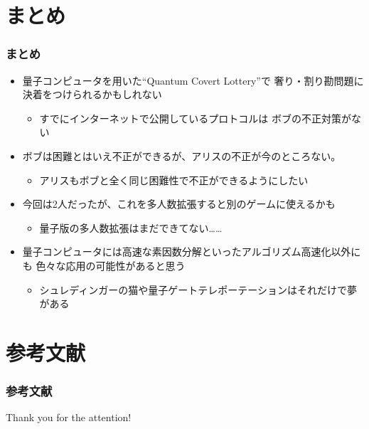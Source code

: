 \section{まとめ}

\begin{frame}
  \frametitle{まとめ}

  \pause
  \begin{itemize}
    \item<+-> 量子コンピュータを用いた``Quantum Covert Lottery''で
    奢り・割り勘問題に決着をつけられるかもしれない
    \begin{itemize} 
      \item すでにインターネットで公開しているプロトコル\cite{quantum_covert_lottery}は
      ボブの不正対策がない
    \end{itemize}

    \item<+-> ボブは困難とはいえ不正ができるが、アリスの不正が今のところない。
    \begin{itemize} 
      \item アリスもボブと全く同じ困難性で不正ができるようにしたい
    \end{itemize}

    \item<+-> 今回は2人だったが、これを多人数拡張すると別のゲームに使えるかも
    \begin{itemize}
      \item 量子版の多人数拡張はまだできてない……
    \end{itemize}

    \item<+-> 量子コンピュータには高速な素因数分解といったアルゴリズム高速化以外にも
    色々な応用の可能性があると思う
    \begin{itemize}
      \item シュレディンガーの猫や量子ゲートテレポーテーションはそれだけで夢がある
    \end{itemize}
  \end{itemize}
\end{frame}

\section*{参考文献}
\begin{frame}[allowframebreaks]
  \frametitle{参考文献}
  
  
\end{frame}

\begin{frame}
  \centering
  {\Huge Thank you for the attention!}
\end{frame}


